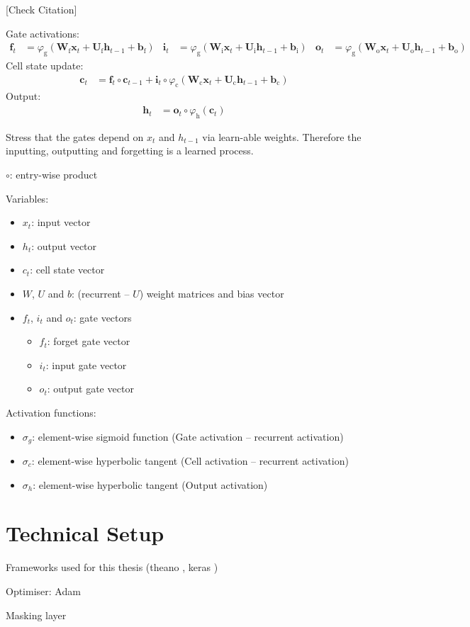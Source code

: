 [Check Citation]\cite{lstm}

Gate activations:
\begin{align*}
  \mathbf{f}_{t} &= \varphi_{\text{g}}\left( \mathbf{W}_{\text{f}} \mathbf{x}_{t} + \mathbf{U}_{\text{f}} \mathbf{h}_{t-1} + \mathbf{b}_{\text{f}} \right) &
  \mathbf{i}_{t} &= \varphi_{\text{g}}\left( \mathbf{W}_{\text{i}} \mathbf{x}_{t} + \mathbf{U}_{\text{i}} \mathbf{h}_{t-1} + \mathbf{b}_{\text{i}} \right) &
  \mathbf{o}_{t} &= \varphi_{\text{g}}\left( \mathbf{W}_{\text{o}} \mathbf{x}_{t} + \mathbf{U}_{\text{o}} \mathbf{h}_{t-1} + \mathbf{b}_{\text{o}} \right)
\end{align*}
Cell state update:
\begin{align*}
  \mathbf{c}_{t} &= \mathbf{f}_{t} \circ \mathbf{c}_{t-1}
                   + \mathbf{i}_{t} \circ \varphi_{\text{c}}(
                   \mathbf{W}_{\text{c}} \mathbf{x}_{t}+ \mathbf{U}_{\text{c}}
                   \mathbf{h}_{t-1} + \mathbf{b}_{\text{c}})
\end{align*}
Output:
\begin{align*}
  \mathbf{h}_{t} &= \mathbf{o}_{t} \circ \varphi_{\text{h}}(\mathbf{c}_{t})
\end{align*}

Stress that the gates depend on $x_t$ and $h_{t-1}$ via learn-able weights.
Therefore the inputting, outputting and forgetting is a learned process.

$\circ$: entry-wise product


Variables:
\begin{itemize}
\item $x_t$: input vector
\item $h_t$: output vector
\item $c_t$: cell state vector
\item $W$, $U$ and $b$: (recurrent -- $U$) weight matrices and bias vector
\item $f_t$, $i_t$ and $o_t$: gate vectors
  \begin{itemize}
  \item $f_t$: forget gate vector
  \item $i_t$: input gate vector
  \item $o_t$: output gate vector
  \end{itemize}
\end{itemize}

Activation functions:
\begin{itemize}
\item $\sigma_g$: element-wise sigmoid function (Gate activation -- recurrent
  activation)
\item $\sigma_c$: element-wise hyperbolic tangent (Cell activation -- recurrent
  activation)
\item $\sigma_h$: element-wise hyperbolic tangent (Output activation)
\end{itemize}


\section{Technical Setup}
\label{sec:tech_setup}

Frameworks used for this thesis (theano \cite{theano}, keras \cite{keras})

Optimiser: Adam

Masking layer


